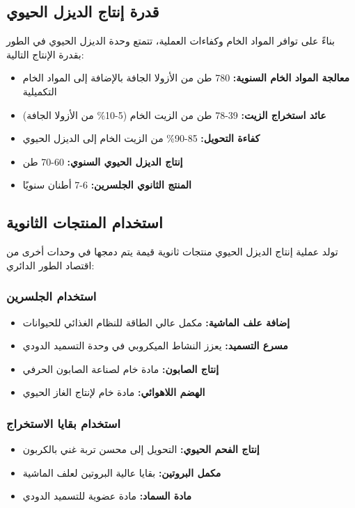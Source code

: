 \subsection{قدرة إنتاج الديزل الحيوي}

بناءً على توافر المواد الخام وكفاءات العملية، تتمتع وحدة الديزل الحيوي في الطور بقدرة الإنتاج التالية:

\begin{itemize}
    \item \textbf{معالجة المواد الخام السنوية:} 780 طن من الأزولا الجافة بالإضافة إلى المواد الخام التكميلية
    \item \textbf{عائد استخراج الزيت:} 39-78 طن من الزيت الخام (5-10\% من الأزولا الجافة)
    \item \textbf{كفاءة التحويل:} 85-90\% من الزيت الخام إلى الديزل الحيوي
    \item \textbf{إنتاج الديزل الحيوي السنوي:} 60-70 طن
    \item \textbf{المنتج الثانوي الجلسرين:} 6-7 أطنان سنويًا
\end{itemize}

\subsection{استخدام المنتجات الثانوية}

تولد عملية إنتاج الديزل الحيوي منتجات ثانوية قيمة يتم دمجها في وحدات أخرى من اقتصاد الطور الدائري:

\subsubsection{استخدام الجلسرين}
\begin{itemize}
    \item \textbf{إضافة علف الماشية:} مكمل عالي الطاقة للنظام الغذائي للحيوانات
    \item \textbf{مسرع التسميد:} يعزز النشاط الميكروبي في وحدة التسميد الدودي
    \item \textbf{إنتاج الصابون:} مادة خام لصناعة الصابون الحرفي
    \item \textbf{الهضم اللاهوائي:} مادة خام لإنتاج الغاز الحيوي
\end{itemize}

\subsubsection{استخدام بقايا الاستخراج}
\begin{itemize}
    \item \textbf{إنتاج الفحم الحيوي:} التحويل إلى محسن تربة غني بالكربون
    \item \textbf{مكمل البروتين:} بقايا عالية البروتين لعلف الماشية
    \item \textbf{مادة السماد:} مادة عضوية للتسميد الدودي
\end{itemize}

